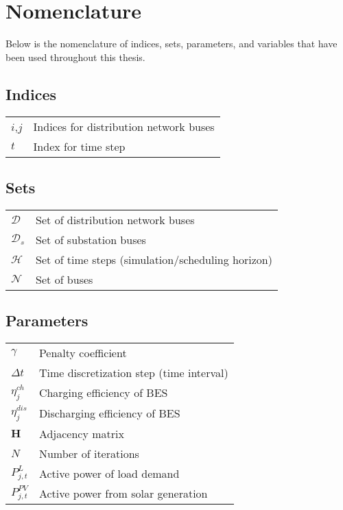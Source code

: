 \thispagestyle{plain}			%

\chapter*{Nomenclature}
Below is the nomenclature of indices, sets, parameters, and variables that have been used throughout this thesis.

\section*{Indices}
\renewcommand*{\arraystretch}{1.35}
\begin{longtable}{p{3cm}p{12cm}}
$i$,$j$ & Indices for distribution network buses\\
$t$ & Index for time step\\
\end{longtable}

\section*{Sets}
\renewcommand*{\arraystretch}{1.35}
\begin{longtable}{p{3cm}p{12cm}}
$\mathcal{D}$ & Set of distribution network buses\\
$\mathcal{D}_{s}$ & Set of substation buses \\
$\mathcal{H}$ & Set of time steps (simulation/scheduling horizon)\\
$\mathcal{N}$ & Set of buses\\
\end{longtable}

\section*{Parameters}
\renewcommand*{\arraystretch}{1.35}
\begin{longtable}{p{3cm}p{12cm}}
$\gamma$& Penalty coefficient\\
$\Delta t$& Time discretization step (time interval)\\
$\eta_{j}^{ch}$& Charging efficiency of BES\\
$\eta_{j}^{dis}$& Discharging efficiency of BES\\
$\boldsymbol{H}$& Adjacency matrix\\
$N$ & Number of iterations\\
$P_{j,t}^{L}$& Active power of load demand\\
$P_{j,t}^{PV}$& Active power from solar generation\\
\end{longtable}

